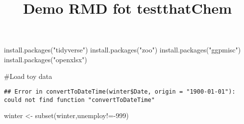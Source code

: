 \documentclass[
]{article}
\title{Demo RMD fot testthatChem}
\author{}
\date{\vspace{-2.5em}}
\newenvironment{Shaded}{\begin{snugshade}}{\end{snugshade}}
\newcommand{\AttributeTok}[1]{\textcolor[rgb]{0.77,0.63,0.00}{#1}}
\newcommand{\DecValTok}[1]{\textcolor[rgb]{0.00,0.00,0.81}{#1}}
\newcommand{\FunctionTok}[1]{\textcolor[rgb]{0.00,0.00,0.00}{#1}}
\newcommand{\NormalTok}[1]{#1}
\newcommand{\OtherTok}[1]{\textcolor[rgb]{0.56,0.35,0.01}{#1}}
\newcommand{\SpecialCharTok}[1]{\textcolor[rgb]{0.00,0.00,0.00}{#1}}
\newcommand{\StringTok}[1]{\textcolor[rgb]{0.31,0.60,0.02}{#1}}
\begin{document}
\maketitle

\begin{Shaded}
\begin{Highlighting}[]
\FunctionTok{install.packages}\NormalTok{(}\StringTok{"tidyverse"}\NormalTok{)}
\FunctionTok{install.packages}\NormalTok{(}\StringTok{"zoo"}\NormalTok{)}
\FunctionTok{install.packages}\NormalTok{(}\StringTok{"ggpmisc"}\NormalTok{)}
\FunctionTok{install.packages}\NormalTok{(}\StringTok{"openxlsx"}\NormalTok{)}
\end{Highlighting}
\end{Shaded}

\#Load toy data

\begin{Shaded}
\end{Shaded}

\begin{verbatim}
## Error in convertToDateTime(winter$Date, origin = "1900-01-01"): could not find function "convertToDateTime"
\end{verbatim}

\begin{Shaded}
\begin{Highlighting}[]
\NormalTok{winter }\OtherTok{\textless{}{-}} \FunctionTok{subset}\NormalTok{(winter,unemploy}\SpecialCharTok{!={-}}\DecValTok{999}\NormalTok{)}
\end{Highlighting}
\end{Shaded}

\begin{Shaded}
\end{Shaded}
\end{document}
